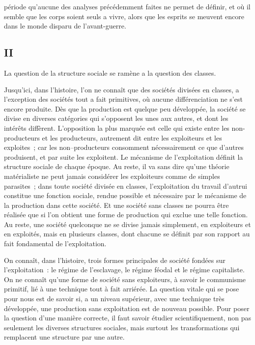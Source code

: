 \documentclass[french,twoside]{book} %
\begin{document}
période qu'aucune des analyses précédemment faites ne permet de définir, et où il semble que les corps soient seuls a vivre, alors que les esprits se meuvent encore dans le monde disparu de l'avant-guerre.
\subsection[{II}]{II}
\noindent La question de la structure sociale se ramène a la question des classes.\par
Jusqu'ici, dans l'histoire, l'on ne connaît que des sociétés divisées en classes, a l'exception des sociétés tout a fait primitives, où aucune différenciation ne s'est encore produite. Dès que la production est quelque peu développée, la société se divise en diverses catégories qui s'opposent les unes aux autres, et dont les intérêts diffèrent. L'opposition la plus marquée est celle qui existe entre les non-producteurs et les producteurs, autrement dit entre les exploiteurs et les exploites ; car les non--producteurs consomment nécessairement ce que d'autres produisent, et par suite les exploitent. Le mécanisme de l'exploitation définit la structure sociale de chaque époque. Au reste, il va sans dire qu'une théorie matérialiste ne peut jamais considérer les exploiteurs comme de simples parasites ; dans toute société divisée en classes, l'exploitation du travail d'autrui constitue une fonction sociale, rendue possible et nécessaire par le mécanisme de la production dans cette société. Et une société sans classes ne pourra être réalisée que si l'on obtient une forme de production qui exclue une telle fonction. Au reste, une société quelconque ne se divise jamais simplement, en exploiteurs et en exploités, mais en plusieurs classes, dont chacune se définit par son rapport au fait fondamental de l'exploitation.\par
On connaît, dans l'histoire, trois formes principales de société fondées sur l'exploitation : le régime de l'esclavage, le régime féodal et le régime capitaliste. On ne connaît qu'une forme de société sans exploiteurs, à savoir le communisme primitif, lié à une technique tout à fait arriérée. La question vitale qui se pose pour nous est de savoir si, a un niveau supérieur, avec une technique très développée, une production sans exploitation est de nouveau possible. Pour poser la question d'une manière correcte, il faut savoir étudier scientifiquement, non pas seulement les diverses structures sociales, mais surtout les transformations qui remplacent une structure par une autre.\par
\end{document}
